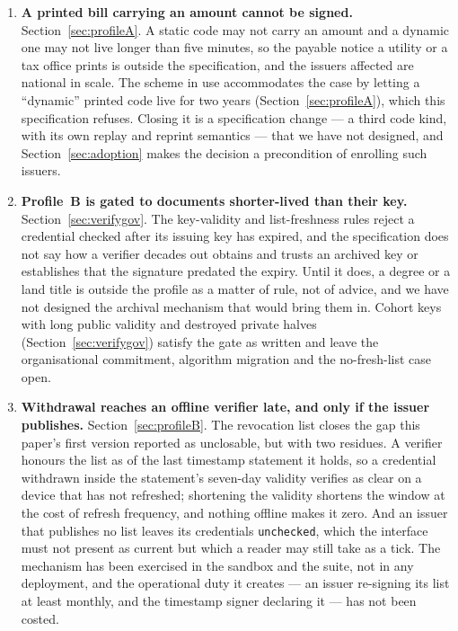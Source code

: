 \documentclass[10pt,a4paper,twocolumn]{article}
\newcommand{\code}[1]{\texttt{\small #1}}
\begin{document}
\begin{enumerate}[leftmargin=1.6em]
  \item \textbf{A printed bill carrying an amount cannot be signed.}
    Section~\ref{sec:profileA}. A static code may not carry an amount and a
    dynamic one may not live longer than five minutes, so the payable notice a
    utility or a tax office prints is outside the specification, and the
    issuers affected are national in scale. The scheme in use accommodates
    the case by letting a ``dynamic'' printed code live for two years
    (Section~\ref{sec:profileA}), which this specification refuses. Closing
    it is a specification change --- a third code kind, with its own replay
    and reprint semantics --- that we have not designed, and
    Section~\ref{sec:adoption} makes the decision a precondition of enrolling
    such issuers.

  \item \textbf{Profile~B is gated to documents shorter-lived than their key.}
    Section~\ref{sec:verifygov}. The key-validity and list-freshness rules
    reject a credential checked after its issuing key has expired, and the
    specification does not say how a verifier decades out obtains and trusts
    an archived key or establishes that the signature predated the expiry.
    Until it does, a degree or a land title is outside the profile as a matter
    of rule, not of advice, and we have not designed the archival mechanism
    that would bring them in. Cohort keys with long public validity and
    destroyed private halves (Section~\ref{sec:verifygov}) satisfy the gate
    as written and leave the organisational commitment, algorithm migration
    and the no-fresh-list case open.

  \item \textbf{Withdrawal reaches an offline verifier late, and only if the
    issuer publishes.} Section~\ref{sec:profileB}. The revocation list closes
    the gap this paper's first version reported as unclosable, but with two
    residues. A verifier honours the list as of the last timestamp statement
    it holds, so a credential withdrawn inside the statement's seven-day
    validity verifies as clear on a device that has not refreshed; shortening
    the validity shortens the window at the cost of refresh frequency, and
    nothing offline makes it zero. And an issuer that publishes no list
    leaves its credentials \code{unchecked}, which the interface must not
    present as current but which a reader may still take as a tick. The
    mechanism has been exercised in the sandbox and the suite, not in any
    deployment, and the operational duty it creates --- an issuer re-signing
    its list at least monthly, and the timestamp signer declaring it --- has
    not been costed.


\end{enumerate}
\end{document}
